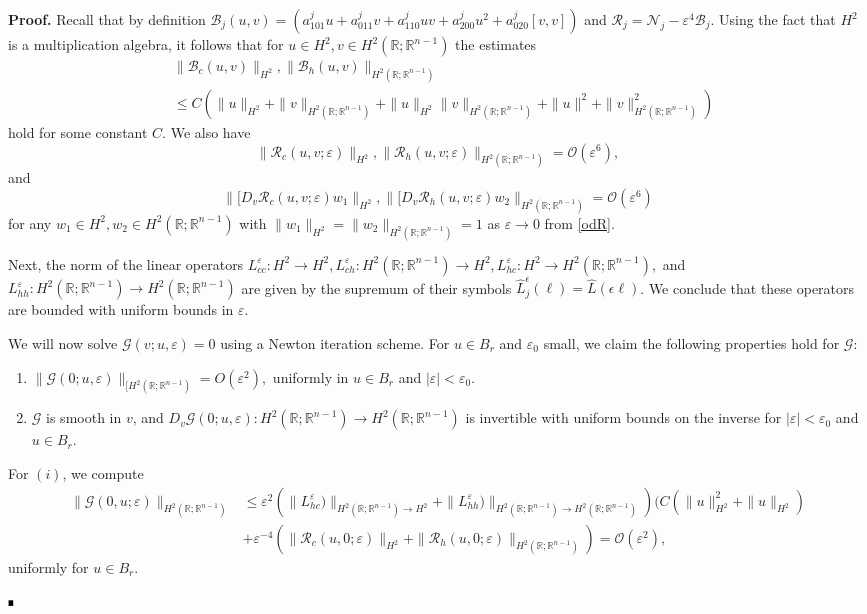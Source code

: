 \documentclass[letterpaper,11pt]{article}
\newcommand{\R}{\mathbb{R}}
\newcommand{\rmO}{\mathcal{O}}
\newcommand{\eps}{\varepsilon}
\newcommand{\B}{\mathcal{B}}
\newcommand{\Rm}{\mathcal{R}}
\newcommand{\Nl}{\mathcal{N}}
\newcommand{\G}{\mathcal{G}}
\numberwithin{equation}{section}
\theoremstyle{plain}
\theoremstyle{remark}
\newenvironment{Proof}[1][.]%
 {\begin{trivlist}\item[]\textbf{Proof#1 }}%
 {\hspace*{\fill}$\rule{0.3\baselineskip}{0.35\baselineskip}$\end{trivlist}}
\begin{document}
\begin{Proof}  Recall that by definition $\B_j(u,v)=\left(a^j_{101} u+a^j_{011} v+a^j_{110}uv + a^j_{200}u^2+a^j_{020}[v,v] \right)$ and $\Rm_j = \Nl_j-\eps^4\B_j$. Using the fact that $H^2$ is a multiplication algebra, it follows that for $u \in H^2, v \in H^2(\R;\R^{n-1})$ the estimates
\begin{align*}
&\|\B_c(u,v)\|_{H^2},\|\B_h(u,v)\|_{H^2(\R;\R^{n-1})} \\
 &\le C\left(\|u\|_{H^2}+\|v\|_{H^2(\R;\R^{n-1})}+\|u\|_{H^2}\|v\|_{H^2(\R;\R^{n-1})} +\|u\|^2+\|v\|^2_{H^2(\R;\R^{n-1})}\right)
\end{align*}
hold for some constant $C$. We also have
\[
 \|\Rm_c(u,v;\eps)\|_{H^2},  \|\Rm_h(u,v;\eps)\|_{H^2(\R;\R^{n-1})} = \rmO(\eps^6), 
\]
and
\[
\|[D_v \Rm_c(u,v;\eps) w_1\|_{H^2}, \|[D_v \Rm_h(u,v;\eps) w_2\|_{H^2(\R;\R^{n-1})} = \rmO(\eps^6)
\]
for any $w_1 \in H^2, w_2 \in H^2(\R;\R^{n-1})$ with $\|w_1\|_{H^2}= \|w_2\|_{H^2(\R;\R^{n-1})}=1$ as $\eps \to 0$ from \eqref{odR}.


Next, the norm of the linear operators $L^\eps_{cc} : H^2 \to H^2, L^\eps_{ch}:H^2(\R;\R^{n-1}) \to H^2, L^\eps_{hc}:H^2 \to H^2(\R;\R^{n-1}),$ and $L^\eps_{hh}:H^2(\R;\R^{n-1}) \to H^2(\R;\R^{n-1})$ are given by the supremum of their symbols $\widehat{L}^\epsilon_j (\ell)=\widehat{L}(\epsilon\ell)$. We conclude that these operators are bounded with uniform bounds in $\eps$.

We will now solve $\G(v;u,\eps)=0$ using a Newton iteration scheme. For $u \in B_r$ and $\eps_0$ small, we claim the following properties hold for $\G$:
\begin{enumerate}
\item $\|\G(0;u,\eps)\|_{[H^2(\R;\R^{n-1})} = O(\eps^2),$ uniformly in $u\in B_r$ and $|\eps| < \eps_0$.
\item $\G$ is smooth in $v$, and $D_v \G(0; u, \eps):H^2(\R;\R^{n-1}) \to H^2(\R;\R^{n-1})$ is invertible with uniform bounds on the inverse for $|\eps|<\eps_0$ and $u \in B_r$. 
\end{enumerate}

For $(i)$, we compute 
\begin{align*}
\|\G(0,u;\eps)\|_{H^2(\R;\R^{n-1})} &\le \eps^2\left(\| L_{hc}^\eps)\|_{H^2(\R;\R^{n-1}) \to H^2}+\| L_{hh}^\eps)\|_{H^2(\R;\R^{n-1}) \to H^2(\R;\R^{n-1})}\right)(C (\|u\|_{H^2}^2+\|u\|_{H^2})\\
&+\eps^{-4}(\|\Rm_c(u,0;\eps)\|_{H^2}+\|\Rm_h(u,0;\eps)\|_{H^2(\R;\R^{n-1})}) = \rmO(\eps^2),
\end{align*}
uniformly for $u\in B_r$.


\end{Proof}
\end{document}
